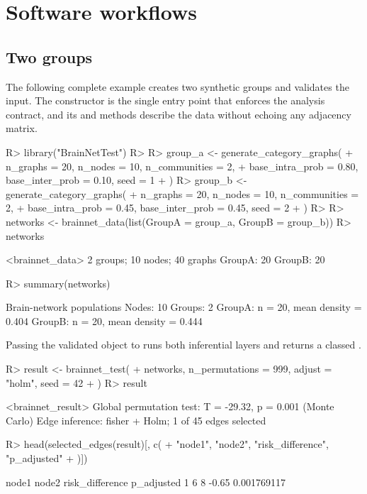 \documentclass[article]{jss}\usepackage[]{graphicx}\usepackage[]{xcolor}
\newcommand{\class}[1]{\code{#1}}
\begin{document}
\section{Software workflows}
\label{sec:workflow}

\subsection{Two groups}

The following complete example creates two synthetic groups and validates the
input. The constructor is the single entry point that enforces the analysis
contract, and its  and  methods describe the data
without echoing any adjacency matrix.

\begin{Schunk}
\begin{Sinput}
R> library("BrainNetTest")
R> 
R> group_a <- generate_category_graphs(
+    n_graphs = 20, n_nodes = 10, n_communities = 2,
+    base_intra_prob = 0.80, base_inter_prob = 0.10, seed = 1
+  )
R> group_b <- generate_category_graphs(
+    n_graphs = 20, n_nodes = 10, n_communities = 2,
+    base_intra_prob = 0.45, base_inter_prob = 0.45, seed = 2
+  )
R> 
R> networks <- brainnet_data(list(GroupA = group_a, GroupB = group_b))
R> networks
\end{Sinput}
\begin{Soutput}
<brainnet_data>
2 groups; 10 nodes; 40 graphs
  GroupA: 20
  GroupB: 20
\end{Soutput}
\begin{Sinput}
R> summary(networks)
\end{Sinput}
\begin{Soutput}
Brain-network populations
  Nodes: 10
  Groups: 2
  GroupA: n = 20, mean density = 0.404
  GroupB: n = 20, mean density = 0.444
\end{Soutput}
\end{Schunk}

Passing the validated object to  runs both inferential
layers and returns a classed \class{brainnet\_result}.

\begin{Schunk}
\begin{Sinput}
R> result <- brainnet_test(
+    networks, n_permutations = 999, adjust = "holm", seed = 42
+  )
R> result
\end{Sinput}
\begin{Soutput}
<brainnet_result>
Global permutation test: T = -29.32, p = 0.001 (Monte Carlo)
Edge inference: fisher + Holm; 1 of 45 edges selected
\end{Soutput}
\begin{Sinput}
R> head(selected_edges(result)[, c(
+    "node1", "node2", "risk_difference", "p_adjusted"
+  )])
\end{Sinput}
\begin{Soutput}
  node1 node2 risk_difference  p_adjusted
1     6     8           -0.65 0.001769117
\end{Soutput}
\end{Schunk}
\end{document}
